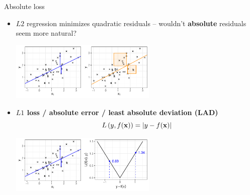 \documentclass[11pt,compress,t,notes=noshow, xcolor=table]{beamer}
\begin{document}
\begin{vbframe}{Absolute loss}

\begin{itemize}
    \item $L2$ regression minimizes quadratic residuals -- wouldn't 
    \textbf{absolute} residuals seem more natural? 
    \vspace{0.2cm}
    \begin{center}
    \includegraphics[width=0.55\textwidth]{figure/reg_l1_residual_abs_vs_quad}
    \end{center}
    \item \textbf{$L1$ loss / absolute error / least absolute deviation (LAD)}
    $$L\left(y, f(\mathbf{x})\right) = |y - f(\mathbf{x})|$$
    \begin{center}
    \includegraphics[width=0.55\textwidth]{figure/reg_l1_lossplot_abs}
    \end{center}
\end{itemize}

\end{vbframe}

\end{document}
